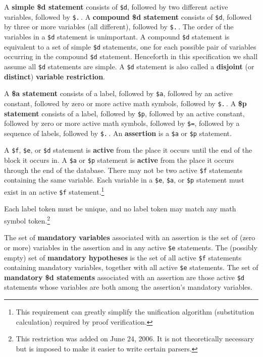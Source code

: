 A {\bf simple \$d statement}
consists of \texttt{\$d}, followed by two different active variables,
followed by \texttt{\$.}\,.  A {\bf compound \$d
statement} consists of
\texttt{\$d}, followed by three or more variables (all different),
followed by \texttt{\$.}\,.  The order of the variables in a
\texttt{\$d} statement is unimportant.  A compound \texttt{\$d}
statement is equivalent to a set of simple \texttt{\$d} statements, one
for each possible pair of variables occurring in the compound
\texttt{\$d} statement.  Henceforth in this specification we shall
assume all \texttt{\$d} statements are simple.  A \texttt{\$d} statement
is also called a {\bf disjoint} (or {\bf distinct}) {\bf variable
restriction}.

A {\bf \$a statement} consists of a label,
followed by \texttt{\$a}, followed by an active constant, followed by
zero or more active math symbols, followed by \texttt{\$.}\,.  A {\bf
\$p statement} consists of a label,
followed by \texttt{\$p}, followed by an active constant, followed by
zero or more active math symbols, followed by \texttt{\$=}, followed by
a sequence of labels, followed by \texttt{\$.}\,.  An {\bf
assertion} is a \texttt{\$a} or \texttt{\$p} statement.

A \texttt{\$f}, \texttt{\$e}, or \texttt{\$d} statement is {\bf active} from the place it occurs until the end of the block it occurs in.
A \texttt{\$a} or \texttt{\$p} statement is {\bf active} from the place it occurs
through the end of the database.
There may not be two active \texttt{\$f} statements containing the same
variable.  Each variable in a \texttt{\$e}, \texttt{\$a}, or
\texttt{\$p} statement must exist in an active \texttt{\$f}
statement.\footnote{This requirement can greatly simplify the
unification algorithm (substitution calculation) required by proof
verification.}

Each label token must be unique, and
no label token may match any math symbol
token.\label{namespace}\footnote{This
restriction was added on June 24, 2006.
It is not theoretically necessary but is imposed to make it easier to
write certain parsers.}

The set of {\bf mandatory variables} associated with
an assertion is the set of (zero or more) variables in the assertion and in any
active \texttt{\$e} statements.  The (possibly empty) set of {\bf mandatory
hypotheses} is the set of all active \texttt{\$f}
statements containing mandatory variables, together with all active \texttt{\$e}
statements.
The set of {\bf mandatory {\bf \$d} statements} associated with an assertion are those active
\texttt{\$d} statements whose variables are both among the assertion's
mandatory variables.

